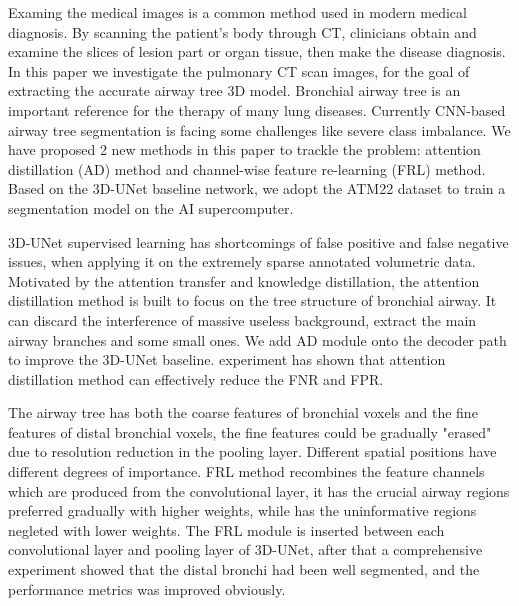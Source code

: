\begin{abstract*}
  Examing the medical images is a common method used in modern medical diagnosis. By scanning the patient's body through CT, 
  clinicians obtain and examine the slices of lesion part or organ tissue, then make the disease diagnosis. In this paper we
  investigate the pulmonary CT scan images, for the goal of extracting the accurate airway tree 3D model. Bronchial airway
  tree is an important reference for the therapy of many lung diseases. Currently CNN-based airway tree segmentation is facing 
  some challenges like severe class imbalance. We have proposed 2 new methods in this paper to trackle the problem: attention distillation (AD) method 
  and channel-wise feature re-learning (FRL) method. Based on the 3D-UNet baseline network, we adopt the ATM22 dataset to train a segmentation model on
  the AI supercomputer.

  3D-UNet supervised learning has shortcomings of false positive and false negative issues, when applying it on the extremely sparse annotated volumetric 
  data. Motivated by the attention transfer and knowledge distillation, the attention distillation method is built to focus on the tree structure of bronchial
  airway. It can discard the interference of massive useless background, extract the main airway branches and some small ones. We add AD module onto the decoder
  path to improve the 3D-UNet baseline. experiment has shown that attention distillation method can effectively reduce the FNR and FPR.

  The airway tree has both the coarse features of bronchial voxels and the fine features of distal bronchial voxels, the fine features could be gradually 
  "erased" due to resolution reduction in the pooling layer. Different spatial positions have different degrees of importance. FRL method recombines the feature channels which 
  are produced from the convolutional layer, it has the crucial airway regions preferred gradually with higher weights, while has the uninformative regions negleted with lower weights.
  The FRL module is inserted between each convolutional layer and pooling layer of 3D-UNet, after that a comprehensive experiment showed that the distal bronchi had 
  been well segmented, and the performance metrics was improved obviously.
\end{abstract*}
